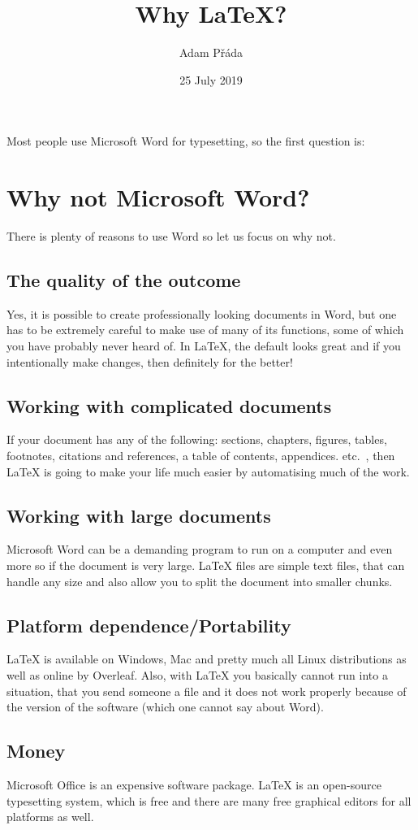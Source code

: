 \documentclass[11pt]{article}
\title{Why \LaTeX?}
\author{Adam Přáda}
\date{25 July 2019}
\begin{document}
\maketitle
Most people use Microsoft Word for typesetting, so the first question is:
\section{Why not Microsoft Word?}
There is plenty of reasons to use Word so let us focus on why not.
\subsection{The quality of the outcome}
Yes, it is possible to create professionally looking documents in Word, but one has to be extremely careful to make use of many of its functions, some of which you have probably never heard of. In LaTeX, the default looks great and if you intentionally make changes, then definitely for the better!
\subsection{Working with complicated documents}
If your document has any of the following: sections, chapters, figures, tables, footnotes, citations and references, a table of contents, appendices. etc.~, then LaTeX is going to make your life much easier by automatising much of the work.
\subsection{Working with large documents}
Microsoft Word can be a demanding program to run on a computer and even more so if the document is very large. LaTeX files are simple text files, that can handle any size and also allow you to split the document into smaller chunks.
\pagebreak
\subsection{Platform dependence/Portability}
LaTeX is available on Windows, Mac and pretty much all Linux distributions as well as online by Overleaf. Also, with LaTeX you basically cannot run into a situation, that you send someone a file and it does not work properly because of the version of the software (which one cannot say about Word).
\subsection{Money}
Microsoft Office is an expensive software package. LaTeX is an open-source typesetting system, which is free and there are many free graphical editors for all platforms as well.
\end{document}

